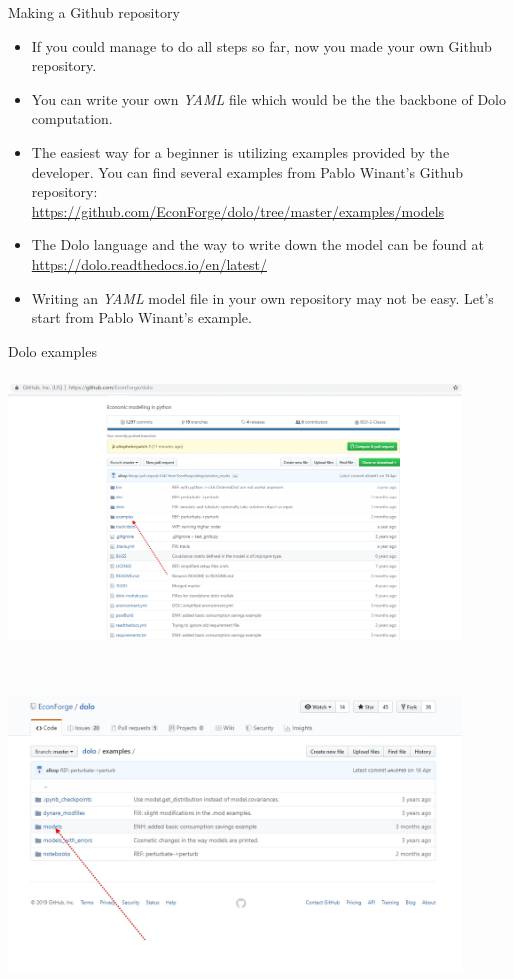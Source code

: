 \documentclass{beamer}
\begin{document}
\begin{frame}{Making a Github repository}
    \begin{itemize}
    \item If you could manage to do all steps so far, now you made your own Github repository. 
    \item You can write your own \textit{YAML} file which would be the the backbone of Dolo computation.
        \item The easiest way for a beginner is utilizing examples provided by the developer. You can find several examples from Pablo Winant's Github repository:\\
        \url{https://github.com/EconForge/dolo/tree/master/examples/models}
        \item The Dolo language and the way to write down the model can be found at \url{https://dolo.readthedocs.io/en/latest/}
        \item Writing an \textit{YAML} model file in your own repository may not be easy. Let's start from Pablo Winant's example. 
    \end{itemize}
\end{frame}
    \begin{frame}{Dolo examples}
 \includegraphics[width=12cm, height= 8cm]{dolo5.jpg}
    \end{frame}
    \begin{frame}{}
         \includegraphics[width=12cm, height= 8cm]{dolo6.jpg}
    \end{frame}
\end{document}
